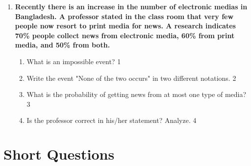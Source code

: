 \documentclass[a4paper,oneside, margin=1.4in]{book}
\begin{document}
\begin{enumerate}
 \item
	  \textbf{Recently there is an increase in the number of electronic medias in Bangladesh. A professor stated in the class room that very few people now resort to print media for news. A research indicates 70\% people collect news from electronic media, 60\% from print media, and 50\% from both.} 
  
  \begin{enumerate}
    \item
	What is an impossible event? \hfill 1
    \item
	Write the event "None of the two occurs" in two different notations. \hfill 2
    \item  
	What is the probability of getting news from at most one type of media? \hfill 3
    \item
	Is the professor correct in his/her statement? Analyze. \hfill 4
  \end{enumerate}
  


  \end{enumerate}

\section{Short Questions}
\end{document}
